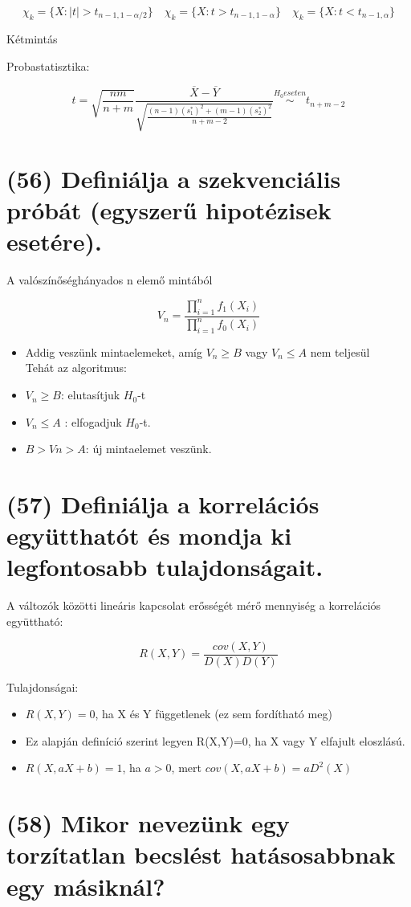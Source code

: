 \documentclass[12p]{article}
\begin{document}
$$\chi_k = \{X: |t| > t_{n-1,1-\alpha/2}\} \quad \chi_k = \{X: t > t_{n-1,1-\alpha}\} \quad \chi_k = \{X: t < t_{n-1, \alpha}\}$$

Kétmintás

Probastatisztika:

$$\displaystyle{t = \sqrt{\frac{nm}{n+m}}\frac{\overline{X} - \overline{Y}}{\sqrt{\frac{(n-1)(s^*_1)^2 + (m-1)(s^*_2)^2}{n+m-2}}} \stackrel{H_0 eseten}{\sim}
t_{n+m-2}}$$

\section{(56) Definiálja a szekvenciális próbát (egyszerű hipotézisek esetére).}

A valószínőséghányados n elemő mintából

$$\displaystyle{V_n = \frac{\prod^n_{i=1} f_1(X_i)}{\prod^n_{i=1} f_0(X_i)}}$$

\begin{itemize}
\item Addig veszünk mintaelemeket, amíg $V_n \geq B$ vagy $V_n \leq A$ nem teljesül\\
Tehát az algoritmus:
\item $V_n \geq B$: elutasítjuk $H_0$-t
\item $V_n \leq A$ : elfogadjuk $H_0$-t.
\item $B>Vn>A$: új mintaelemet veszünk.
\end{itemize}

\section{(57) Definiálja a korrelációs együtthatót és mondja ki legfontosabb tulajdonságait.}

A változók közötti lineáris kapcsolat erősségét mérő
mennyiség a korrelációs együttható: 

$$R(X, Y) = \frac{cov(X,Y)}{D(X)D(Y)}$$

Tulajdonságai:

\begin{itemize}
\item $R(X,Y)=0$, ha X és Y függetlenek (ez sem
fordítható meg)
\item Ez alapján definíció szerint legyen R(X,Y)=0, ha X
vagy Y elfajult eloszlású.
\item $R(X,aX+b)=1$, ha $a>0$, mert $cov(X,aX+b)=aD^2(X)$
\end{itemize}


\section{(58) Mikor nevezünk egy torzítatlan becslést hatásosabbnak egy másiknál?}
\end{document}
